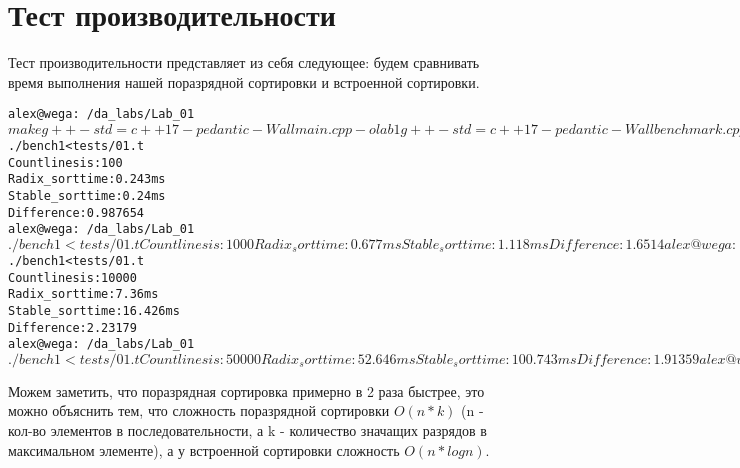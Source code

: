 \section{Тест производительности}


Тест производительности представляет из себя следующее: будем сравнивать время выполнения нашей поразрядной сортировки и 
встроенной сортировки.

\begin{alltt}
alex@wega:~/da_labs/Lab_01$ make
g++ -std=c++17 -pedantic -Wall main.cpp -o lab1
g++ -std=c++17 -pedantic -Wall benchmark.cpp -o bench1
alex@wega:~/da_labs/Lab_01$ ./bench1 < tests/01.t
Count lines is: 100
Radix_sort time: 0.243 ms
Stable_sort time: 0.24 ms
Difference: 0.987654
alex@wega:~/da_labs/Lab_01$ ./bench1 < tests/01.t
Count lines is: 1000
Radix_sort time: 0.677 ms
Stable_sort time: 1.118 ms
Difference: 1.6514
alex@wega:~/da_labs/Lab_01$ ./bench1 < tests/01.t
Count lines is: 10000
Radix_sort time: 7.36 ms
Stable_sort time: 16.426 ms
Difference: 2.23179
alex@wega:~/da_labs/Lab_01$ ./bench1 < tests/01.t
Count lines is: 50000
Radix_sort time: 52.646 ms
Stable_sort time: 100.743 ms
Difference: 1.91359
alex@wega:~/da_labs/Lab_01$
\end{alltt}

Можем заметить, что поразрядная сортировка примерно в 2 раза быстрее, это можно объяснить тем, что сложность поразрядной сортировки
$O(n * k)$ (n - кол-во элементов в последовательности, а k - количество значащих разрядов в максимальном элементе), а у встроенной сортировки сложность $O(n*log n)$. 

\pagebreak
